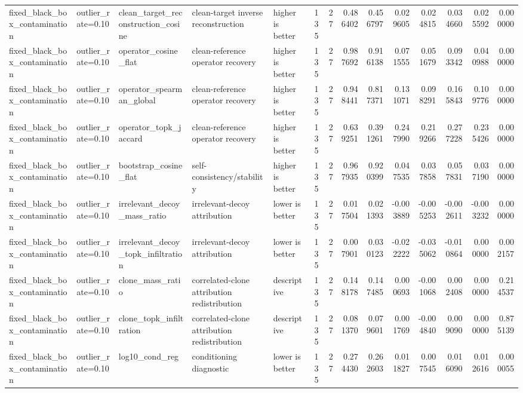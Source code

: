 \begin{table}[t]
\begin{tabular}{lllllrrrrrrrrr}
fixed_black_box_contamination & outlier_rate=0.10 & clean_target_reconstruction_cosine & clean-target inverse reconstruction & higher is better & 135 & 27 & 0.486402 & 0.456797 & 0.029605 & 0.024815 & 0.034660 & 0.025592 & 0.000000 \\
fixed_black_box_contamination & outlier_rate=0.10 & operator_cosine_flat & clean-reference operator recovery & higher is better & 135 & 27 & 0.987692 & 0.916138 & 0.071555 & 0.051679 & 0.093342 & 0.040988 & 0.000000 \\
fixed_black_box_contamination & outlier_rate=0.10 & operator_spearman_global & clean-reference operator recovery & higher is better & 135 & 27 & 0.948441 & 0.817371 & 0.131071 & 0.098291 & 0.165843 & 0.109776 & 0.000000 \\
fixed_black_box_contamination & outlier_rate=0.10 & operator_topk_jaccard & clean-reference operator recovery & higher is better & 135 & 27 & 0.639251 & 0.391261 & 0.247990 & 0.219266 & 0.277228 & 0.235426 & 0.000000 \\
fixed_black_box_contamination & outlier_rate=0.10 & bootstrap_cosine_flat & self-consistency/stability & higher is better & 135 & 27 & 0.967935 & 0.920399 & 0.047535 & 0.037858 & 0.057831 & 0.037190 & 0.000000 \\
fixed_black_box_contamination & outlier_rate=0.10 & irrelevant_decoy_mass_ratio & irrelevant-decoy attribution & lower is better & 135 & 27 & 0.017504 & 0.021393 & -0.003889 & -0.005253 & -0.002611 & -0.003232 & 0.000000 \\
fixed_black_box_contamination & outlier_rate=0.10 & irrelevant_decoy_topk_infiltration & irrelevant-decoy attribution & lower is better & 135 & 27 & 0.007901 & 0.030123 & -0.022222 & -0.035062 & -0.010864 & 0.000000 & 0.002157 \\
fixed_black_box_contamination & outlier_rate=0.10 & clone_mass_ratio & correlated-clone attribution redistribution & descriptive & 135 & 27 & 0.148178 & 0.147485 & 0.000693 & -0.001068 & 0.002408 & 0.000000 & 0.214537 \\
fixed_black_box_contamination & outlier_rate=0.10 & clone_topk_infiltration & correlated-clone attribution redistribution & descriptive & 135 & 27 & 0.081370 & 0.079601 & 0.001769 & -0.004840 & 0.009090 & 0.000000 & 0.875139 \\
fixed_black_box_contamination & outlier_rate=0.10 & log10_cond_reg & conditioning diagnostic & lower is better & 135 & 27 & 0.274430 & 0.262603 & 0.011827 & 0.007545 & 0.016090 & 0.012616 & 0.000055 \\

\end{tabular}
\end{table}
